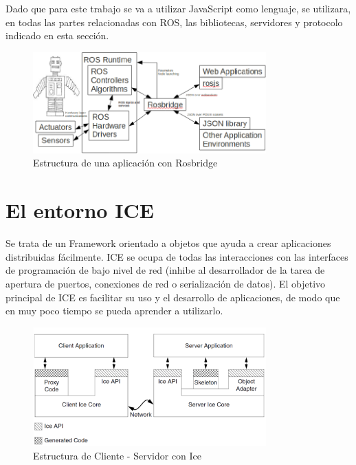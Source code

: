 Dado que para este trabajo se va a utilizar JavaScript como lenguaje, se utilizara, en todas las partes relacionadas con ROS, las bibliotecas, servidores y protocolo indicado en esta sección.

\begin{figure}[H]
  \begin{center}
    \includegraphics[width=0.8\textwidth]{figures/estructurarosbridge.png}
		\caption{Estructura de una aplicación con Rosbridge}
		\label{fig.estructurarosbridge}
		\end{center}
\end{figure}

\section{El entorno ICE}
Se trata de un Framework orientado a objetos que ayuda a crear aplicaciones distribuidas fácilmente. ICE se ocupa de todas las interacciones con las interfaces de programación de bajo nivel de red (inhibe al desarrollador de la tarea de apertura de puertos, conexiones de red o serialización de datos). El objetivo principal de ICE es facilitar su uso y el desarrollo de aplicaciones, de modo que en muy poco tiempo se pueda aprender a utilizarlo.

\begin{figure}[H]
  \begin{center}
    \includegraphics[width=0.8\textwidth]{figures/estructuraice.png}
		\caption{Estructura de Cliente - Servidor con Ice}
		\label{fig.estructurarice}
		\end{center}
\end{figure}

